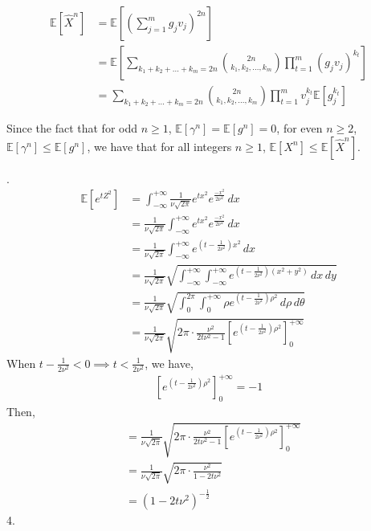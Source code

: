 \begin{align}
    \nonumber \mathbb{E}[\widehat{X}^n]&=\mathbb{E}\left[\left(\sum_{j=1}^{m}g_jv_j\right)^{2n}\right]\\
    \nonumber &=\mathbb{E}\left[\sum_{k_1+k_2+...+k_m=2n}\binom{2n}{k_1,k_2,...,k_m}\prod_{t=1}^{m}(g_jv_j)^{k_t} \right]\\
    \nonumber &=\sum_{k_1+k_2+...+k_m=2n}\binom{2n}{k_1,k_2,...,k_m}\prod_{t=1}^{m}v_j^{k_t}\mathbb{E}\left[g_j^{k_t}\right]
\end{align}

Since the fact that for odd $n\ge 1$, $\mathbb{E}[\gamma^n]=\mathbb{E}[g^n]=0$, 
for even ‎$n\ge 2$, $\mathbb{E}[\gamma^n]\le\mathbb{E}[g^n]$, we have that for all integers $n\ge 1$, $\mathbb{E}[X^n] \le \mathbb{E}[\widehat{X}^n]$.

.
\begin{align}
    \nonumber \mathbb{E}\left[ e^{tZ^2} \right]&=\int_{-\infty }^{+\infty }\frac{1}{\nu \sqrt{2\pi}}e^{tx^2}e^{\frac{-x^2}{2\nu ^2}}\,dx\\
    \nonumber &=\frac{1}{\nu \sqrt{2\pi}}\int_{-\infty }^{+\infty }e^{tx^2}e^{\frac{-x^2}{2\nu^2}}\,dx\\
    \nonumber &=\frac{1}{\nu \sqrt{2\pi}}\int_{-\infty }^{+\infty }e^{(t-\frac{1}{2\nu^2})x^2}\,dx\\
    \nonumber &=\frac{1}{\nu \sqrt{2\pi}}\sqrt{\int_{-\infty }^{+\infty }\int_{-\infty }^{+\infty }e^{(t-\frac{1}{2\nu^2})(x^2+y^2)}\,dx\,dy}\\
    \nonumber &=\frac{1}{\nu \sqrt{2\pi}}\sqrt{ \int_{0}^{2\pi}\int_{0 }^{+\infty }\rho e^{(t-\frac{1}{2\nu^2})\rho^2}\,d\rho\,d\theta   }\\
    \nonumber &=\frac{1}{\nu \sqrt{2\pi}}\sqrt{ 2\pi\cdot\frac{\nu^2}{2t\nu^2-1}\left[e^{ (t-\frac{1}{2\nu^2})\rho^2}\right]_{0}^{+\infty} }
\end{align}
When $t-\frac{1}{2\nu^2}<0\implies t<\frac{1}{2\nu^2}$, we have,
\begin{align}
    \nonumber \left[e^{ (t-\frac{1}{2\nu^2})\rho^2}\right]_{0}^{+\infty}=-1
\end{align}
Then,
\begin{align}
    \nonumber &=\frac{1}{\nu \sqrt{2\pi}}\sqrt{ 2\pi\cdot\frac{\nu^2}{2t\nu^2-1}\left[e^{ (t-\frac{1}{2\nu^2})\rho^2}\right]_{0}^{+\infty} }\\
    \nonumber &=\frac{1}{\nu \sqrt{2\pi}}\sqrt{2\pi\cdot\frac{\nu^2}{1-2t\nu^2}}\\
    \nonumber &=(1-2t\nu^2)^{-\frac{1}{2}}
\end{align}
4.\\

